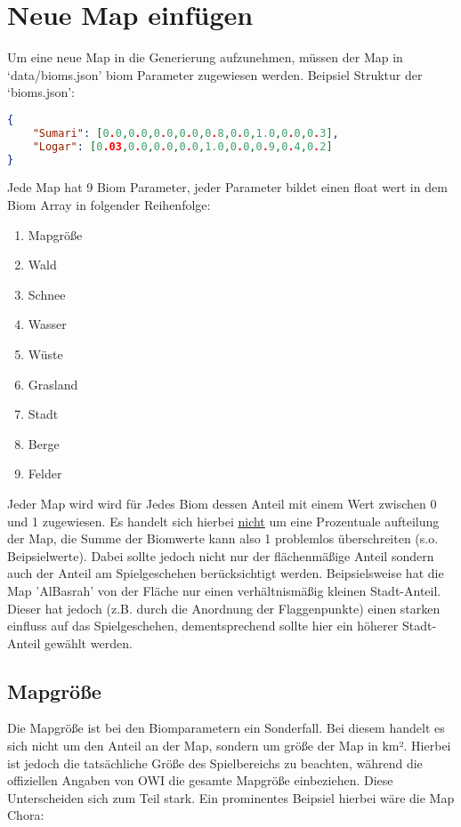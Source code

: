 \section{Neue Map einfügen}
Um eine neue Map in die Generierung aufzunehmen, müssen der Map in `data/bioms.json' biom Parameter zugewiesen werden. \newline
Beipsiel Struktur der `bioms.json': \newline

\begin{lstlisting}[language=json, firstnumber=1]
{
    "Sumari": [0.0,0.0,0.0,0.0,0.8,0.0,1.0,0.0,0.3],
    "Logar": [0.03,0.0,0.0,0.0,1.0,0.0,0.9,0.4,0.2]
}
\end{lstlisting}
Jede Map hat 9 Biom Parameter, jeder Parameter bildet einen float wert in dem Biom Array in folgender Reihenfolge: \newline
\begin{enumerate}
    \item Mapgröße
    \item Wald
    \item Schnee
    \item Wasser
    \item Wüste
    \item Grasland
    \item Stadt
    \item Berge
    \item Felder
\end{enumerate}

Jeder Map wird wird für Jedes Biom dessen Anteil mit einem Wert zwischen 0 und 1 zugewiesen. 
Es handelt sich hierbei \underline{nicht} um eine Prozentuale aufteilung der Map, die Summe der Biomwerte kann also 1 problemlos überschreiten (s.o. Beipsielwerte). \newline
Dabei sollte jedoch nicht nur der flächenmäßige Anteil sondern auch der Anteil am Spielgeschehen berücksichtigt werden.
Beipsielsweise hat die Map 'AlBasrah' von der Fläche nur einen verhältnismäßig kleinen Stadt-Anteil.
Dieser hat jedoch (z.B. durch die Anordnung der Flaggenpunkte) einen starken einfluss auf das Spielgeschehen,
 dementsprechend sollte hier ein höherer Stadt-Anteil gewählt werden.
\newpage

\subsection{Mapgröße}
Die Mapgröße ist bei den Biomparametern ein Sonderfall.\newline
Bei diesem handelt es sich nicht um den Anteil an der Map, sondern um größe der Map in km².\newline
Hierbei ist jedoch die tatsächliche Größe des Spielbereichs zu beachten, 
während die offiziellen Angaben von OWI die gesamte Mapgröße einbeziehen. Diese Unterscheiden sich zum Teil stark.\newline
Ein prominentes Beipsiel hierbei wäre die Map Chora:\newline

